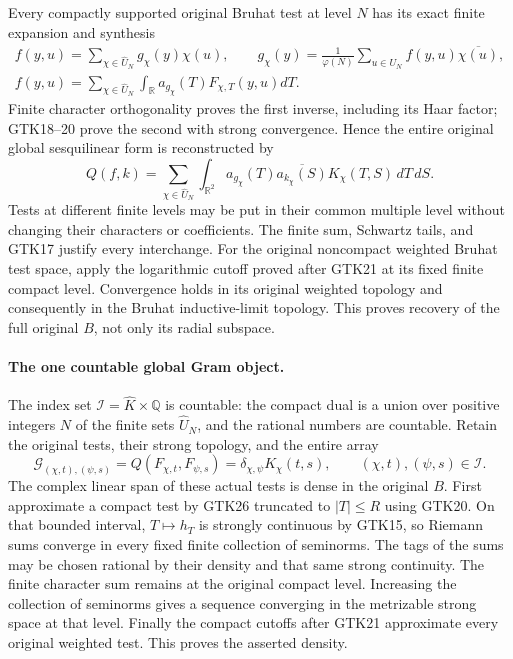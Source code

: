 Every compactly supported original Bruhat test at level
$N$ has its exact finite expansion and synthesis
\begin{equation}\tag{GTK26}
 \begin{gathered}
 f(y,u)=\sum_{\chi\in\widehat U_N}g_\chi(y)\chi(u),
 \qquad
 g_\chi(y)=\frac1{\varphi(N)}
            \sum_{u\in U_N}f(y,u)\overline{\chi(u)},\\
 f(y,u)=\sum_{\chi\in\widehat U_N}
              \int_{\mathbb R}a_{g_\chi}(T)F_{\chi,T}(y,u)dT .
 \end{gathered}
\end{equation}
Finite character orthogonality proves the first inverse,
including its Haar factor; GTK18--20 prove the second
with strong convergence. Hence the entire original
global sesquilinear form is reconstructed by
\begin{equation}\tag{GTK27}
 Q(f,k)=\sum_{\chi\in\widehat U_N}
    \int_{\mathbb R^2}a_{g_\chi}(T)
        \overline{a_{k_\chi}(S)}K_\chi(T,S)\,dT\,dS.
\end{equation}
Tests at different finite levels may be put in their
common multiple level without changing their characters
or coefficients. The finite sum, Schwartz tails, and
GTK17 justify every interchange. For the original
noncompact weighted Bruhat test space, apply the
logarithmic cutoff proved after GTK21 at its fixed
finite compact level. Convergence holds in its original
weighted topology and consequently in the Bruhat
inductive-limit topology. This proves recovery of the
full original $B$, not only its radial subspace.

\paragraph{The one countable global Gram object.}
The index set
$\mathcal I=\widehat K\times\mathbb Q$ is countable:
the compact dual is a union over positive integers
$N$ of the finite sets $\widehat U_N$, and the
rational numbers are countable. Retain the original
tests, their strong topology, and the entire array
\begin{equation}\tag{GTK27a}
 \mathscr G_{(\chi,t),(\psi,s)}
       =Q(F_{\chi,t},F_{\psi,s})
       =\delta_{\chi,\psi}K_\chi(t,s),
                  \qquad (\chi,t),(\psi,s)\in\mathcal I .
\end{equation}
The complex linear span of these actual tests is
dense in the original $B$. First approximate a
compact test by GTK26 truncated to $|T|\le R$
using GTK20. On that bounded interval,
$T\mapsto h_T$ is strongly continuous by GTK15,
so Riemann sums converge in every fixed finite
collection of seminorms. The tags of the sums
may be chosen rational by their density and
that same strong continuity. The finite
character sum remains at the original compact
level. Increasing the collection of seminorms
gives a sequence converging in the metrizable
strong space at that level. Finally the compact
cutoffs after GTK21 approximate every original
weighted test. This proves the asserted density.

